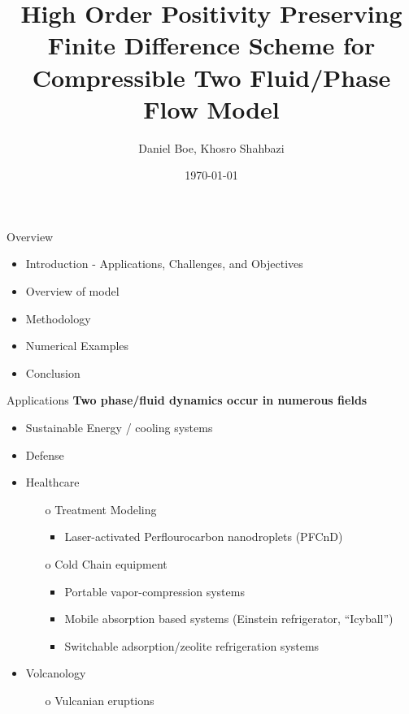 \documentclass[9pt]{beamer}
\title{High Order Positivity Preserving Finite Difference Scheme for Compressible Two Fluid/Phase Flow Model}
\date{\today}
\author{Daniel Boe, Khosro Shahbazi}
\institute{South Dakota School of Mines and Technology}
\begin{document}
\maketitle

\begin{frame}{Overview}
  \begin{itemize}
  \item Introduction - Applications, Challenges, and Objectives
  \item Overview of model
  \item Methodology
  \item Numerical Examples
  \item Conclusion
  \end{itemize}
  \end{frame}

  \begin{frame}{Applications}
    \textbf{Two phase/fluid dynamics occur in numerous fields}
    \begin{itemize}
      \item Sustainable Energy / cooling systems
      \item Defense
      \item Healthcare
      \begin{itemize}
        \item[o] Treatment Modeling
        \begin{itemize}
          \item Laser-activated Perflourocarbon nanodroplets (PFCnD)
        \end{itemize} 
        \item[o] Cold Chain equipment
        \begin{itemize}
          \item Portable vapor-compression systems
          \item Mobile absorption based systems (Einstein refrigerator, ``Icyball'')
          \item Switchable adsorption/zeolite refrigeration systems
        \end{itemize} 
      \end{itemize}
      \item Volcanology
        \begin{itemize}
          \item[o] Vulcanian eruptions
        \end{itemize}
    \end{itemize}
  \end{frame}
\end{document}
